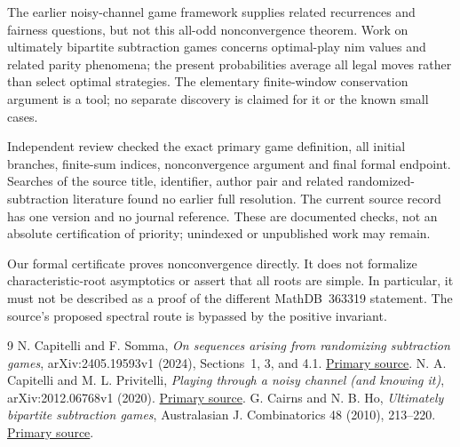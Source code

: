 \documentclass[11pt]{article}
\begin{document}
The earlier noisy-channel game framework \cite{CP} supplies related
recurrences and fairness questions, but not this all-odd nonconvergence
theorem. Work on ultimately bipartite subtraction games \cite{CH}
concerns optimal-play nim values and related parity phenomena; the
present probabilities average all legal moves rather than select optimal
strategies. The elementary finite-window conservation argument is a tool;
no separate discovery is claimed for it or the known small cases.

Independent review checked the exact primary game definition, all
initial branches, finite-sum indices, nonconvergence argument and final
formal endpoint. Searches of the source title, identifier, author pair
and related randomized-subtraction literature found no earlier full
resolution. The current source record has one version and no journal
reference. These are documented checks, not an absolute certification of
priority; unindexed or unpublished work may remain.

Our formal certificate proves nonconvergence directly. It does not
formalize characteristic-root asymptotics or assert that all roots are
simple. In particular, it must not be described as a proof of the
different MathDB~363319 statement. The source's proposed spectral route
is bypassed by the positive invariant.

\begin{thebibliography}{9}
 N. Capitelli and F. Somma,
\emph{On sequences arising from randomizing subtraction games},
arXiv:2405.19593v1 (2024), Sections~1, 3, and 4.1.
\href{https://arxiv.org/abs/2405.19593}{Primary source}.
 N. A. Capitelli and M. L. Privitelli,
\emph{Playing through a noisy channel (and knowing it)},
arXiv:2012.06768v1 (2020).
\href{https://arxiv.org/abs/2012.06768}{Primary source}.
 G. Cairns and N. B. Ho,
\emph{Ultimately bipartite subtraction games},
Australasian J. Combinatorics 48 (2010), 213--220.
\href{https://ajc.maths.uq.edu.au/pdf/48/ajc_v48_p213.pdf}{Primary source}.
\end{thebibliography}
\end{document}

